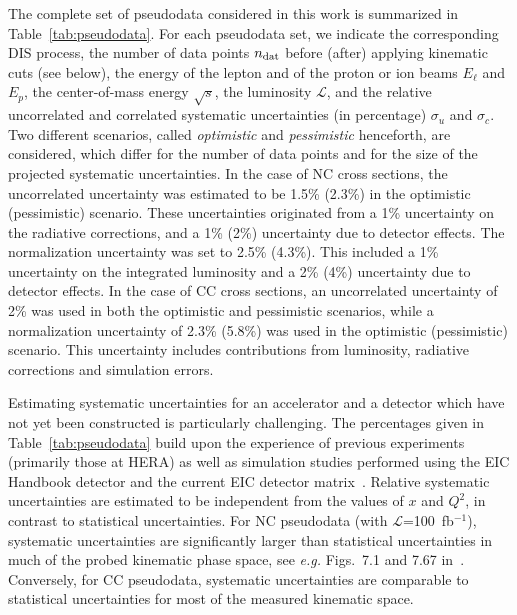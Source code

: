 \documentclass[11pt,a4paper]{article}
\begin{document}
The complete set of pseudodata considered in this work is summarized in
Table~\ref{tab:pseudodata}. For each pseudodata set, we indicate the
corresponding DIS process, the number of data points $n_{\rm dat}$ before (after)
applying kinematic cuts (see below), the energy of the lepton and of the proton
or ion beams $E_\ell$ and $E_p$, the center-of-mass energy $\sqrt{s}$, the
luminosity $\mathcal{L}$, and the relative uncorrelated and correlated
systematic uncertainties (in percentage) $\sigma_u$ and $\sigma_c$.
Two different scenarios, called {\it optimistic} and {\it pessimistic}
henceforth, are considered, which differ for the number of data points and
for the size of the projected systematic uncertainties. In the case of NC
cross sections, the uncorrelated uncertainty was estimated to be 1.5\% (2.3\%)
in the optimistic (pessimistic) scenario. These uncertainties originated from a 1\%
uncertainty on the radiative corrections, and a 1\% (2\%) uncertainty due to
detector effects. The normalization uncertainty was set to 2.5\% (4.3\%). This
included a 1\% uncertainty on the integrated luminosity and a 2\% (4\%)
uncertainty due to detector effects. In the case of CC cross sections,
an uncorrelated uncertainty of 2\% was used in both the optimistic and
pessimistic scenarios, while a normalization uncertainty of 2.3\% (5.8\%)
was used in the optimistic (pessimistic) scenario. This uncertainty includes
contributions from luminosity, radiative corrections and simulation errors.

Estimating systematic uncertainties for an accelerator and a detector which
have not yet been constructed is particularly challenging. The percentages
given in Table~\ref{tab:pseudodata} build upon the experience of previous
experiments (primarily those at HERA) as well as simulation studies performed
using the EIC Handbook detector and the current EIC detector
matrix~\cite{EIC:handbook}. Relative systematic uncertainties are
estimated to be independent from the values of $x$ and $Q^2$, in contrast to
statistical uncertainties. For NC pseudodata (with $\mathcal{L}$=100~fb$^{-1}$),
systematic uncertainties are significantly larger than statistical
uncertainties in much of the probed kinematic phase space, see {\it e.g.}
Figs.~7.1 and 7.67 in~\cite{AbdulKhalek:2021gbh}. Conversely, for CC pseudodata,
systematic uncertainties are comparable to statistical uncertainties for most
of the measured kinematic space.
\end{document}
